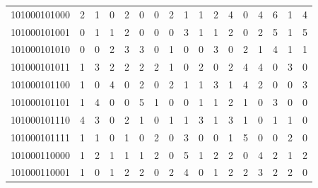 \documentclass[10pt,a4paper]{article}
\begin{document}
\begin{longtable}{ |c|c|c|c|c|c|c|c|c|c|c|c|c|c|c|c|c| }
    101000101000              & 2                            & 1                                & 0                            & 2                              & 0   & 0   & 2   & 1   & 1   & 2   & 4   & 0   & 4   & 6   & 1   & 4   \\
    101000101001              & 0                            & 1                                & 1                            & 2                              & 0   & 0   & 0   & 3   & 1   & 1   & 2   & 0   & 2   & 5   & 1   & 5   \\
    101000101010              & 0                            & 0                                & 2                            & 3                              & 3   & 0   & 1   & 0   & 0   & 3   & 0   & 2   & 1   & 4   & 1   & 1   \\
    101000101011              & 1                            & 3                                & 2                            & 2                              & 2   & 2   & 1   & 0   & 2   & 0   & 2   & 4   & 4   & 0   & 3   & 0   \\
    101000101100              & 1                            & 0                                & 4                            & 0                              & 2   & 0   & 2   & 1   & 1   & 3   & 1   & 4   & 2   & 0   & 0   & 3   \\
    101000101101              & 1                            & 4                                & 0                            & 0                              & 5   & 1   & 0   & 0   & 1   & 1   & 2   & 1   & 0   & 3   & 0   & 0   \\
    101000101110              & 4                            & 3                                & 0                            & 2                              & 1   & 0   & 1   & 1   & 3   & 1   & 3   & 1   & 0   & 1   & 1   & 0   \\
    101000101111              & 1                            & 1                                & 0                            & 1                              & 0   & 2   & 0   & 3   & 0   & 0   & 1   & 5   & 0   & 0   & 2   & 0   \\
    101000110000              & 1                            & 2                                & 1                            & 1                              & 1   & 2   & 0   & 5   & 1   & 2   & 2   & 0   & 4   & 2   & 1   & 2   \\
    101000110001              & 1                            & 0                                & 1                            & 2                              & 2   & 0   & 2   & 4   & 0   & 1   & 2   & 2   & 3   & 2   & 2   & 0   \\

\end{longtable}
\end{document}
